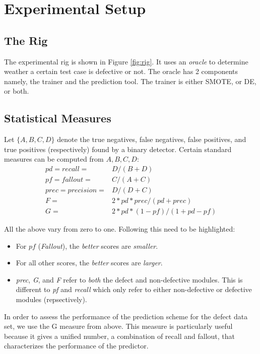 \documentclass[12pt]{IEEEtran}
\begin{document}
\section{Experimental Setup}
\subsection{The Rig}

The experimental rig is shown in Figure \ref{fig:rig}. It uses an \textit{oracle} to determine weather a certain test case is defective or not. The oracle has 2 components namely, the trainer and the prediction tool. The trainer is either SMOTE, or DE, or both.

\subsection{Statistical Measures} \label{stats}
Let $\{A,B,C,D\}$ denote the
true negatives, 
false negatives, 
false positives, and 
true positives
(respectively) found by a binary detector. 
Certain standard measures can be computed from
$A,B,C,D$: 
{\footnotesize
{\[
	\begin{array}{ll}
	pd=recall=&D/(B+D)\\
	pf=fallout=&C/(A+C)\\ 
	prec=precision=&D/(D+C) \\
	F =&2*pd*prec/(pd + prec)\\
	G =&2*pd*(1-pf)/(1+ pd - pf)
	\end{array}
	\]}}

All the above vary from zero to one. Following this need to be highlighted:
\begin{itemize}
\item For $pf$ (\textit{Fallout}), the {\em better} scores are {\em smaller}.
\item For all other scores, the {\em better} scores are {\em larger}.
\item  {\em prec}, \textit{G}, and {\em F} refer to {\em both} the defect and non-defective modules. This is different to {\em pf} and {\em recall} which only refer to either non-defective or defective modules (repsectively). 
\end{itemize}


In order to assess the performance of the prediction scheme for the defect data set, we use the G measure from above. This measure is particularly useful because it gives a unified number, a combination of recall and fallout, that characterizes the performance of the predictor. 
\end{document}
